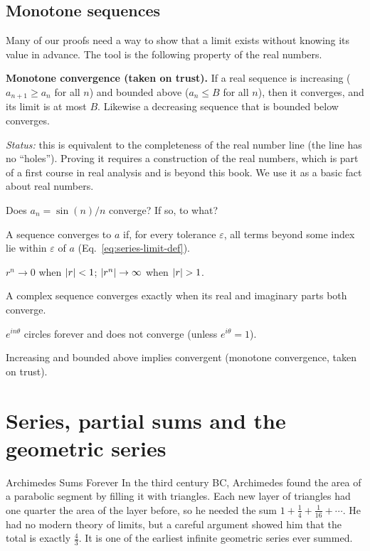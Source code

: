 \subsection{Monotone sequences}

Many of our proofs need a way to show that a limit exists without knowing its value in advance. The tool is the following property of the real numbers.

\begin{beyond}
\textbf{Monotone convergence (taken on trust).} If a real sequence is increasing ($a_{n+1}\ge a_n$ for all $n$) and bounded above ($a_n\le B$ for all $n$), then it converges, and its limit is at most $B$. Likewise a decreasing sequence that is bounded below converges.

\emph{Status:} this is equivalent to the completeness of the real number line (the line has no ``holes''). Proving it requires a construction of the real numbers, which is part of a first course in real analysis and is beyond this book. We use it as a basic fact about real numbers.
\end{beyond}

\begin{checkpoint}
Does $a_n=\sin(n)/n$ converge? If so, to what?
\end{checkpoint}

\begin{keyideas}
\item A sequence converges to $a$ if, for every tolerance $\varepsilon$, all terms beyond some index lie within $\varepsilon$ of $a$ (Eq.~\eqref{eq:series-limit-def}).
\item $r^n\to0$ when $\left\lvert r\right\rvert<1$; $\left\lvert r^n\right\rvert\to\infty$ when $\left\lvert r\right\rvert>1$.
\item A complex sequence converges exactly when its real and imaginary parts both converge.
\item $e^{in\theta}$ circles forever and does not converge (unless $e^{i\theta}=1$).
\item Increasing and bounded above implies convergent (monotone convergence, taken on trust).
\end{keyideas}

\section{Series, partial sums and the geometric series}\label{sec:series-geometric}
\begin{didyouknow}{Archimedes Sums Forever}
In the third century BC, Archimedes found the area of a parabolic segment by filling it with triangles. Each new layer of triangles had one quarter the area of the layer before, so he needed the sum $1+\tfrac14+\tfrac1{16}+\cdots$. He had no modern theory of limits, but a careful argument showed him that the total is exactly $\tfrac43$. It is one of the earliest infinite geometric series ever summed.
\end{didyouknow}

